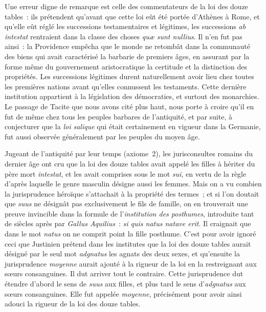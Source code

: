 \documentclass[french,twoside]{book} %
\begin{document}
Une erreur digne de remarque est celle des commentateurs de la loi des douze tables : ils prétendent qu’avant que cette loi eût été portée d’Athènes à Rome, et qu’elle eût réglé les successions testamentaires et légitimes, les successions {\itshape ab intestat} rentraient dans la classe des choses {\itshape quæ sunt nullius}. Il n’en fut pas ainsi : la Providence empêcha  que le monde ne retombât dans la communauté des biens qui avait caractérisé la barbarie de premiers âges, en assurant par la forme même du gouvernement aristocratique la certitude et la distinction des propriétés. Les successions légitimes durent naturellement avoir lieu chez toutes les premières nations avant qu’elles connussent les testaments. Cette dernière institution appartient à la législation des démocraties, et surtout des monarchies. Le passage de Tacite que nous avons cité plus haut, nous porte à croire qu’il en fut de même chez tous les peuples barbares de l’antiquité, et par suite, à conjecturer que la {\itshape loi salique} qui était certainement en vigueur dans la Germanie, fut aussi observée généralement par les peuples du moyen âge.\par
Jugeant de l’antiquité par leur temps (axiome 2), les jurisconsultes romains du dernier âge ont cru que la loi des douze tables avait appelé les filles à hériter du père mort {\itshape intestat}, et les avait comprises sous le mot {\itshape sui}, en vertu de la règle d’après laquelle le genre masculin désigne aussi les femmes. Mais on a vu combien la jurisprudence héroïque s’attachait à la propriété des termes ; et si l’on doutait que {\itshape suus} ne désignât pas exclusivement le fils de famille, on en trouverait une preuve invincible dans la formule de l’{\itshape institution des posthumes}, introduite tant de siècles après par {\itshape Gallus Aquilius} : \emph{{\itshape si quis natus natave erit}}. Il craignait que dans le mot {\itshape natus} on ne comprit point la fille posthume. C’est pour avoir ignoré ceci que Justinien prétend  dans les institutes que la loi des douze tables aurait désigné par le seul mot {\itshape adgnatus} les agnats des deux sexes, et qu’ensuite la jurisprudence {\itshape moyenne} aurait ajouté à la rigueur de la loi en la restreignant aux sœurs consanguines. Il dut arriver tout le contraire. Cette jurisprudence dut étendre d’abord le sens de {\itshape suus} aux filles, et plus tard le sens d’{\itshape adgnatus} aux sœurs consanguines. Elle fut appelée {\itshape moyenne}, précisément pour avoir ainsi adouci la rigueur de la loi des douze tables.\par
\end{document}
